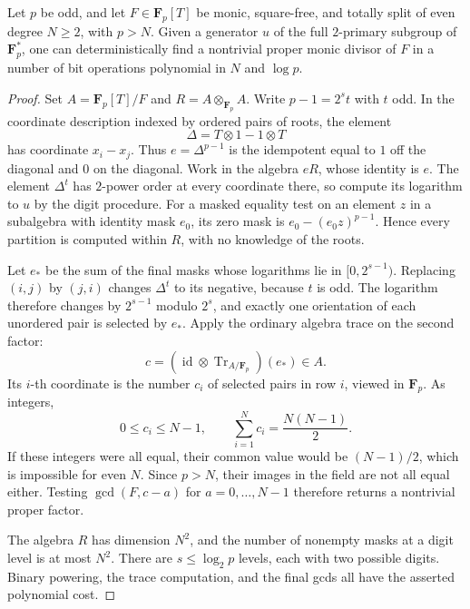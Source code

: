 \begin{proposition}
\label{ff:even-split}
Let $p$ be odd, and let $F\in\mathbf F_p[T]$ be monic, square-free, and
totally split of even degree $N\ge2$, with $p>N$.  Given a generator $u$ of
the full $2$-primary subgroup of $\mathbf F_p^*$, one can deterministically
find a nontrivial proper monic divisor of $F$ in a number of bit operations
polynomial in $N$ and $\log p$.
\end{proposition}

\begin{proof}
Set $A=\mathbf F_p[T]/F$ and $R=A\otimes_{\mathbf F_p}A$.  Write
$p-1=2^s t$ with $t$ odd.  In the coordinate description indexed by ordered
pairs of roots, the element
\[
 \Delta=T\otimes1-1\otimes T
\]
has coordinate $x_i-x_j$.  Thus $e=\Delta^{p-1}$ is the idempotent equal to
$1$ off the diagonal and $0$ on the diagonal.  Work in the algebra $eR$,
whose identity is $e$.  The element $\Delta^t$ has $2$-power order at every
coordinate there, so compute its logarithm to $u$ by the digit procedure.
For a masked equality test on an element $z$ in a subalgebra with identity
mask $e_0$, its zero mask is $e_0-(e_0z)^{p-1}$.  Hence every partition is
computed within $R$, with no knowledge of the roots.

Let $e_*$ be the sum of the final masks whose logarithms lie in
$[0,2^{s-1})$.  Replacing $(i,j)$ by $(j,i)$ changes $\Delta^t$ to its
negative, because $t$ is odd.  The logarithm therefore changes by
$2^{s-1}$ modulo $2^s$, and exactly one orientation of each unordered pair
is selected by $e_*$.  Apply the ordinary algebra trace on the second factor:
\begin{equation}
 c=(\operatorname{id}\otimes\operatorname{Tr}_{A/\mathbf F_p})(e_*)\in A.
 \label{ff:row-counts}
\end{equation}
Its $i$-th coordinate is the number $c_i$ of selected pairs in row $i$,
viewed in $\mathbf F_p$.  As integers,
\[
 0\le c_i\le N-1,
 \qquad \sum_{i=1}^N c_i=\frac{N(N-1)}2.
\]
If these integers were all equal, their common value would be $(N-1)/2$,
which is impossible for even $N$.  Since $p>N$, their images in the field
are not all equal either.  Testing $\gcd(F,c-a)$ for $a=0,\ldots,N-1$
therefore returns a nontrivial proper factor.

The algebra $R$ has dimension $N^2$, and the number of nonempty masks at a
digit level is at most $N^2$.  There are $s\le\log_2p$ levels, each with
two possible digits.  Binary powering, the trace computation, and the final
gcds all have the asserted polynomial cost.
\end{proof}
